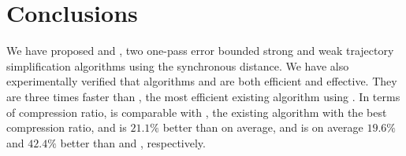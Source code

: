\section{Conclusions} %

We have proposed \cist and \cista, two one-pass error bounded strong and weak trajectory simplification algorithms using the  synchronous distance.
We have also experimentally verified that algorithms \cist and \cista are both efficient and effective.
They are three times faster than \squishe, the most efficient existing \lsa algorithm using \sed.
In terms of compression ratio, \cist is {comparable} with \dps, the existing \lsa algorithm with the best compression ratio, and is $21.1\%$ better than \squishe on average, and \cista is on average $19.6\%$ and $42.4\%$ better than \dps and \squishe, respectively.
